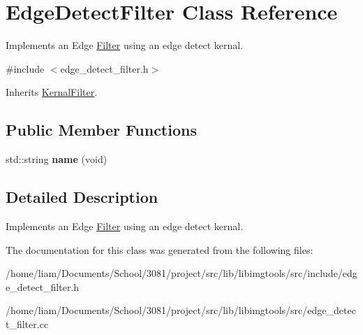 \hypertarget{classEdgeDetectFilter}{}\section{Edge\+Detect\+Filter Class Reference}
\label{classEdgeDetectFilter}


Implements an Edge \hyperlink{classFilter}{Filter} using an edge detect kernal.  




{\ttfamily \#include $<$edge\+\_\+detect\+\_\+filter.\+h$>$}



Inherits \hyperlink{classKernalFilter}{Kernal\+Filter}.

\subsection*{Public Member Functions}
\begin{DoxyCompactItemize}
\item 
std\+::string {\bfseries name} (void)\hypertarget{classEdgeDetectFilter_a902f061b6c0787d4cee3db53c01a43fb}{}\label{classEdgeDetectFilter_a902f061b6c0787d4cee3db53c01a43fb}

\end{DoxyCompactItemize}


\subsection{Detailed Description}
Implements an Edge \hyperlink{classFilter}{Filter} using an edge detect kernal. 

The documentation for this class was generated from the following files\+:\begin{DoxyCompactItemize}
\item 
/home/liam/\+Documents/\+School/3081/project/src/lib/libimgtools/src/include/edge\+\_\+detect\+\_\+filter.\+h\item 
/home/liam/\+Documents/\+School/3081/project/src/lib/libimgtools/src/edge\+\_\+detect\+\_\+filter.\+cc\end{DoxyCompactItemize}
